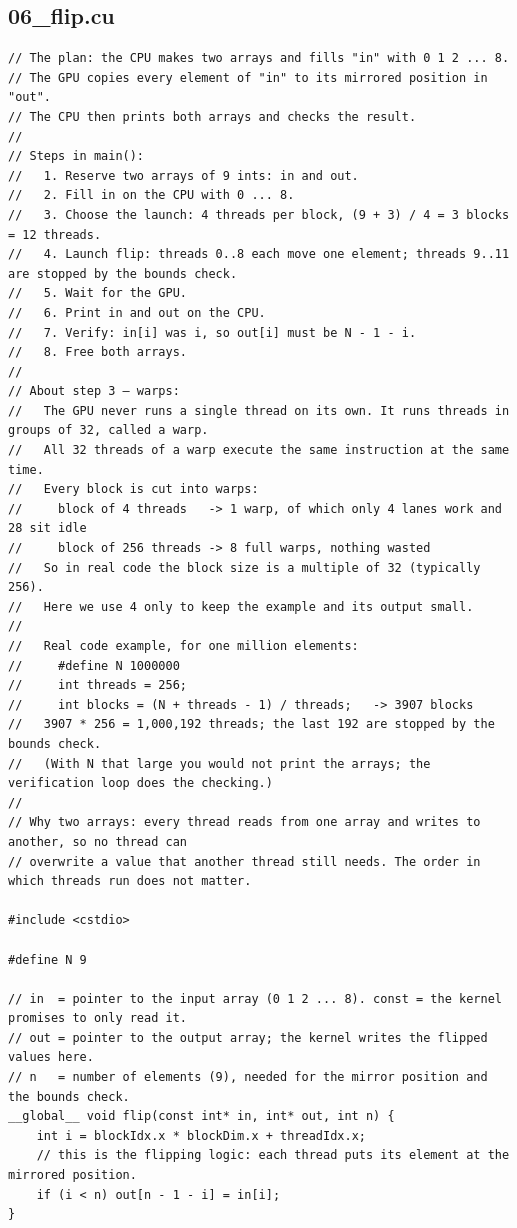 \documentclass[11pt,a4paper]{article}
\begin{document}
\subsection{06\_flip.cu}
\begin{lstlisting}[language=CUDA]
// The plan: the CPU makes two arrays and fills "in" with 0 1 2 ... 8.
// The GPU copies every element of "in" to its mirrored position in "out".
// The CPU then prints both arrays and checks the result.
//
// Steps in main():
//   1. Reserve two arrays of 9 ints: in and out.
//   2. Fill in on the CPU with 0 ... 8.
//   3. Choose the launch: 4 threads per block, (9 + 3) / 4 = 3 blocks = 12 threads.
//   4. Launch flip: threads 0..8 each move one element; threads 9..11 are stopped by the bounds check.
//   5. Wait for the GPU.
//   6. Print in and out on the CPU.
//   7. Verify: in[i] was i, so out[i] must be N - 1 - i.
//   8. Free both arrays.
//
// About step 3 — warps:
//   The GPU never runs a single thread on its own. It runs threads in groups of 32, called a warp.
//   All 32 threads of a warp execute the same instruction at the same time.
//   Every block is cut into warps:
//     block of 4 threads   -> 1 warp, of which only 4 lanes work and 28 sit idle
//     block of 256 threads -> 8 full warps, nothing wasted
//   So in real code the block size is a multiple of 32 (typically 256).
//   Here we use 4 only to keep the example and its output small.
//
//   Real code example, for one million elements:
//     #define N 1000000
//     int threads = 256;
//     int blocks = (N + threads - 1) / threads;   -> 3907 blocks
//   3907 * 256 = 1,000,192 threads; the last 192 are stopped by the bounds check.
//   (With N that large you would not print the arrays; the verification loop does the checking.)
//
// Why two arrays: every thread reads from one array and writes to another, so no thread can
// overwrite a value that another thread still needs. The order in which threads run does not matter.

#include <cstdio>

#define N 9

// in  = pointer to the input array (0 1 2 ... 8). const = the kernel promises to only read it.
// out = pointer to the output array; the kernel writes the flipped values here.
// n   = number of elements (9), needed for the mirror position and the bounds check.
__global__ void flip(const int* in, int* out, int n) {
    int i = blockIdx.x * blockDim.x + threadIdx.x;
    // this is the flipping logic: each thread puts its element at the mirrored position.
    if (i < n) out[n - 1 - i] = in[i];
}


\end{lstlisting}
\end{document}

